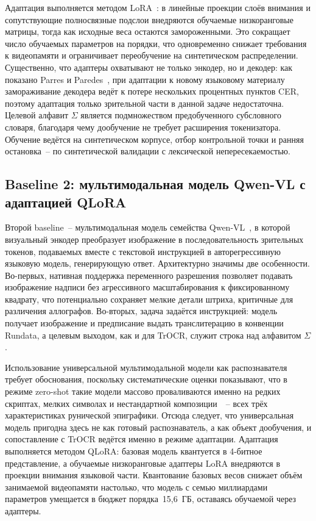 \documentclass[a4paper,12pt]{extarticle}
\begin{document}
Адаптация выполняется методом LoRA~\cite{hu2022}: в линейные проекции слоёв внимания и сопутствующие полносвязные подслои внедряются обучаемые низкоранговые матрицы, тогда как исходные веса остаются замороженными. Это сокращает число обучаемых параметров на порядки, что одновременно снижает требования к видеопамяти и ограничивает переобучение на синтетическом распределении. Существенно, что адаптеры охватывают не только энкодер, но и декодер: как показано Parres и Paredes~\cite{parres2023}, при адаптации к новому языковому материалу замораживание декодера ведёт к потере нескольких процентных пунктов CER, поэтому адаптация только зрительной части в данной задаче недостаточна. Целевой алфавит $\Sigma$ является подмножеством предобученного субсловного словаря, благодаря чему дообучение не требует расширения токенизатора. Обучение ведётся на синтетическом корпусе, отбор контрольной точки и ранняя остановка~-- по синтетической валидации с лексической непересекаемостью.
 
\subsection{Baseline 2: мультимодальная модель Qwen-VL с адаптацией QLoRA}
\label{sec:method-qwen}
 
Второй baseline~-- мультимодальная модель семейства Qwen-VL~\cite{wang2024qwen2vl}, в которой визуальный энкодер преобразует изображение в последовательность зрительных токенов, подаваемых вместе с текстовой инструкцией в авторегрессивную языковую модель, генерирующую ответ. Архитектурно значимы две особенности. Во-первых, нативная поддержка переменного разрешения позволяет подавать изображение надписи без агрессивного масштабирования к фиксированному квадрату, что потенциально сохраняет мелкие детали штриха, критичные для различения аллографов. Во-вторых, задача задаётся инструкцией: модель получает изображение и предписание выдать транслитерацию в конвенции Rundata, а целевым выходом, как и для TrOCR, служит строка над алфавитом $\Sigma$.
 
Использование универсальной мультимодальной модели как распознавателя требует обоснования, поскольку систематические оценки показывают, что в режиме zero-shot такие модели массово проваливаются именно на редких скриптах, мелких символах и нестандартной композиции~\cite{liu2024ocrbench,fu2025ocrbench2}~-- всех трёх характеристиках рунической эпиграфики. Отсюда следует, что универсальная модель пригодна здесь не как готовый распознаватель, а как объект дообучения, и сопоставление с TrOCR ведётся именно в режиме адаптации. Адаптация выполняется методом QLoRA: базовая модель квантуется в 4-битное представление, а обучаемые низкоранговые адаптеры LoRA внедряются в проекции внимания языковой части. Квантование базовых весов снижает объём занимаемой видеопамяти настолько, что модель с семью миллиардами параметров умещается в бюджет порядка~15,6~ГБ, оставаясь обучаемой через адаптеры.
 
\end{document}
